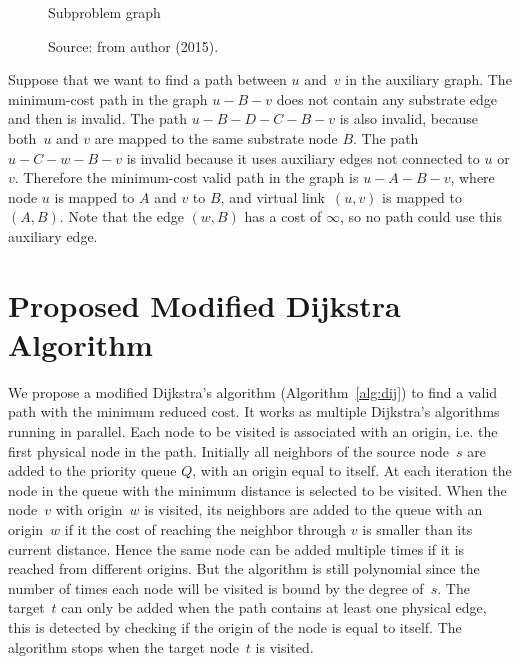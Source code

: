 \begin{figure}[h]
  \centering
  \caption{Subproblem graph\label{fig:subprob}}
\caption*{Source: from author (2015).}\end{figure}


Suppose that we want to find a path between $u$ and~$v$ in the auxiliary graph.
The minimum-cost path in the graph $u - B - v$ does not contain any substrate edge and then is invalid.
The path $u - B - D - C - B - v$ is also invalid, because both~$u$ and $v$ are mapped to the same substrate node $B$.
The path $u - C - w - B - v$ is invalid because it uses auxiliary edges not connected to $u$ or $v$.
Therefore the minimum-cost valid path in the graph is $u - A - B - v$, where
node $u$ is mapped to $A$ and $v$ to $B$, and virtual link~$(u,v)$ is mapped to~$(A,B)$.
Note that the edge $(w,B)$ has a cost of $\infty$, so no path could use this auxiliary edge.

\section{Proposed Modified Dijkstra Algorithm}
We  propose a modified Dijkstra's algorithm (Algorithm~\ref{alg:dij}) to find a valid path with the minimum reduced cost.
It works as multiple Dijkstra's algorithms running in parallel.
Each node to be visited is associated with an origin, i.e. the first physical node in the path.
Initially all neighbors of the source node~$s$ are added to the priority queue $Q$, with an origin equal to itself.
At each iteration the node in the queue with the minimum distance is selected to be visited.
When the node~$v$ with origin~$w$ is visited, its neighbors are added to the queue with an origin~$w$ if it the cost of reaching the neighbor through $v$ is smaller than its current distance.
Hence the same node can be added multiple times if it is reached from different origins.
But the algorithm is still polynomial since the number of times each node will be visited is bound by the degree of~$s$.
The target~$t$ can only be added when the path contains at least one physical edge, this is detected by checking if the origin of the node is equal to itself.
The algorithm stops when the target node~$t$ is visited.

